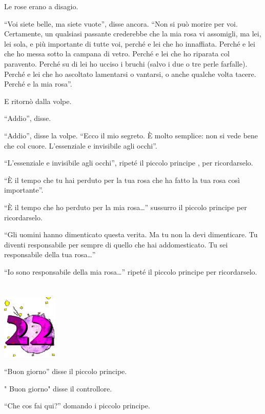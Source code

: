 \documentclass[11pt]{scrbook}
\begin{document}
Le rose erano a disagio.

``Voi siete belle, ma siete vuote'', disse ancora. ``Non si può morire
per voi. Certamente, un qualsiasi passante crederebbe che la mia rosa vi
assomigli, ma lei, lei sola, e più importante di tutte voi, perché e lei
che ho innaffiata. Perché e lei che ho messa sotto la campana di vetro.
Perché e lei che ho riparata col paravento. Perché su di lei ho ucciso i
bruchi (salvo i due o tre perle farfalle). Perché e lei che ho ascoltato
lamentarsi o vantarsi, o anche qualche volta tacere. Perché e la mia
rosa''.

E ritornò dalla volpe.

``Addio'', disse.

``Addio'', disse la volpe. ``Ecco il mio segreto. È molto semplice: non
si vede bene che col cuore. L'essenziale e invisibile agli occhi''.

``L'essenziale e invisibile agli occhi'', ripeté il piccolo principe ,
per ricordarselo.

``È il tempo che tu hai perduto per la tua rosa che ha fatto la tua rosa
così importante''.

``È il tempo che ho perduto per la mia rosa\ldots{}'' sussurro il
piccolo principe per ricordarselo.

``Gli uomini hanno dimenticato questa verita. Ma tu non la devi
dimenticare. Tu diventi responsabile per sempre di quello che hai
addomesticato. Tu sei responsabile della tua rosa\ldots{}''

``Io sono responsabile della mia rosa\ldots{}'' ripeté il piccolo
principe per ricordarselo.

\chapter{}
\begin{center}
\includegraphics{./img/chapter22.png}
\end{center}

``Buon giorno'' disse il piccolo principe.

" Buon giorno" disse il controllore.

``Che cos fai qui?'' domando i piccolo principe.
\end{document}
